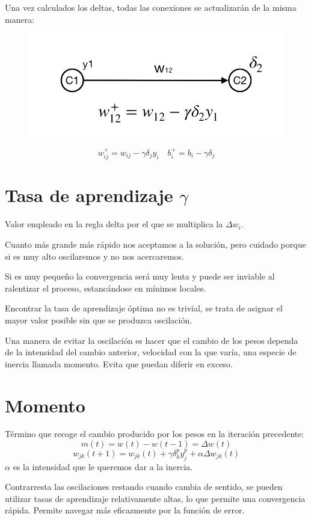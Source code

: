 \documentclass[12pt, twoside, openright]{report} %
\begin{document}
Una vez calculados los deltas, todas las conexiones se actualizarán de la misma manera: 
\begin{figure}[H]
	{\includegraphics[scale=.35]{regla-delta.jpg}}
\end{figure}
$$w^+_{ij} = w_{ij}-\gamma \delta_j y_i \quad b^+_{i}=b_i - \gamma \delta_j$$

\section{Tasa de aprendizaje $\gamma$}
Valor empleado en la regla delta por el que se multiplica la $\Delta w_i$. 

Cuanto más grande más rápido nos aceptamos a la solución, pero cuidado porque si es muy alto oscilaremos y no nos acercaremos. 

Si es muy pequeño la convergencia será muy lenta y puede ser inviable al ralentizar el proceso, estancándose en mínimos locales.

Encontrar la tasa de aprendizaje óptima no es trivial, se trata de asignar el mayor valor posible sin que se produzca oscilación.

Una manera de evitar la oscilación es hacer que el cambio de los pesos dependa de la intensidad del cambio anterior, velocidad con la que varía, una especie de inercia llamada momento. Evita que puedan diferir en exceso.
\pagebreak

\section{Momento}
Término que recoge el cambio producido por los pesos en la iteración precedente:
$$m(t) = w(t) - w(t - 1) = \Delta w(t)$$
$$w_{jk}(t + 1) = w_{jk}(t) + \gamma \delta^p_k y^p_j + \alpha\Delta w_{jk}(t)$$
$\alpha$ es la intensidad que le queremos dar a la inercia.

Contrarresta las oscilaciones restando cuando cambia de sentido, se pueden utilizar tasas de aprendizaje relativamente altas, lo que permite una convergencia rápida. Permite navegar más eficazmente por la función de error.
\end{document}

